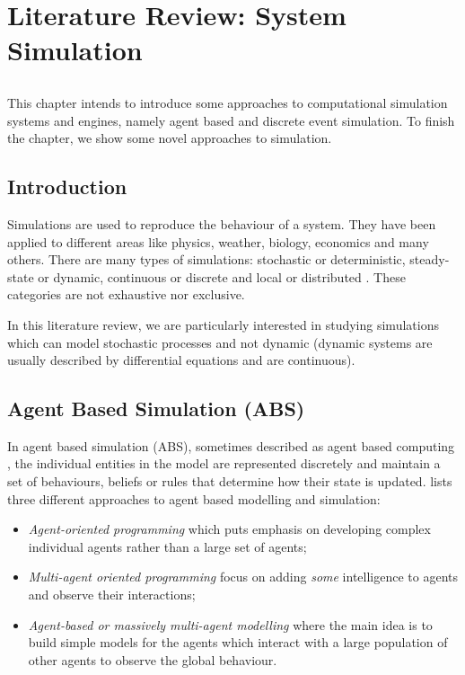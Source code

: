 \chapter{Literature Review: System Simulation} \label{chap:simulation}

\section*{}

This chapter intends to introduce some approaches to computational simulation 
systems and engines, namely agent based and discrete event simulation. To 
finish the chapter, we show some novel approaches to simulation.

\section{Introduction}

Simulations are used to reproduce the behaviour of a system. They have been 
applied to different areas like physics, weather, biology, economics and many 
others. There are many types of simulations: stochastic or deterministic, 
steady-state or dynamic, continuous or discrete and local or distributed 
\cite{WKSimulation}. These categories are not exhaustive nor exclusive.

In this literature review, we are particularly interested in studying 
simulations which can model stochastic processes and not dynamic (dynamic 
systems are usually described by differential equations and are continuous).

\section{Agent Based Simulation (ABS)}

In agent based simulation (ABS), sometimes described as agent based computing 
\cite{wooldridge1998agent, jennings1999agent}, the individual entities in the 
model are represented discretely and maintain a set of behaviours, beliefs or 
rules that determine how their state is updated. \cite{Niazi2011} lists three 
different approaches to agent based modelling and simulation:

\begin{itemize}
    \item \emph{Agent-oriented programming} which puts emphasis on developing 
    complex individual agents rather than a large set of agents;
    \item \emph{Multi-agent oriented programming} focus on adding \emph{some} 
    intelligence to agents and observe their interactions;
    \item \emph{Agent-based or massively multi-agent modelling} where the main 
    idea is to build simple models for the agents which interact with a large 
    population of other agents to observe the global behaviour.
\end{itemize}

